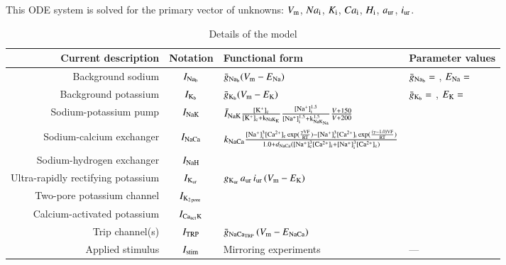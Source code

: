 This ODE system is solved for the primary vector of
unknowns: $V_{\rm m}$, $Na_{\rm i}$, $K_{\rm i}$, $Ca_{\rm i}$,
$H_{\rm i}$, $a_{\rm ur}$, $i_{\rm ur}$.

\begin{table}
\begin{tabular}{r c l l}
\hline\hline
Current description & Notation & Functional form & Parameter values \\ [0.5ex]
\hline
Background sodium & $I_{\rm Na_b}$ & $\bar{g}_{\rm Na_b} (V_{\rm m} - E_{\rm Na})$ \cite{UNKNOWN}
                          & $\bar{g}_{\rm Na_b} = $ \cite{UNKNOWN}, $E_{\rm Na} = $ \cite{UNKNOWN}\\
Background potassium & $I_{\rm K_b}$ & $\bar{g}_{\rm K_b} (V_{\rm m} - E_{\rm K})$ \cite{UNKNOWN}
                          & $\bar{g}_{\rm K_b} = $ \cite{UNKNOWN}, $E_{\rm K} = $ \cite{UNKNOWN}\\
Sodium-potassium pump & $I_{\rm NaK}$ & $\bar{I}_{\rm NaK}
\frac{[\rm K^{+}]_{\rm c}}{[\rm K^{+}]_{\rm c} + k_{\rm NaK_{K}}}
\frac{[\rm Na^{+}]^{1.5}_{\rm i}}{[\rm Na^{+}]^{1.5}_{\rm i} + k^{1.5}_{\rm
    NaK_{Na}}}
\frac{V + 150}{V + 200}$\cite{Nygrenetal1998} & \cite{Nygrenetal1998}\\
Sodium-calcium exchanger & $I_{\rm NaCa}$ & $k_{\rm NaCa}
\frac{[\rm Na^{+}]^{3}_{i}[\rm Ca^{2+}]_{c} \exp(\frac{\gamma V F}{R T}) -
[\rm Na^{+}]^{3}_{c}[\rm Ca^{2+}]_{i} \exp(\frac{(\gamma - 1.0) V F}{R T})}
{1.0 + d_{\rm NaCa}([\rm Na^{+}]^{3}_{c}[\rm Ca^{2+}]_{i} + [\rm
  Na^{+}]^{3}_{i}[\rm Ca^{2+}]_{c})}$
\cite{Nygrenetal1998} & \cite{Nygrenetal1998}\\
Sodium-hydrogen exchanger & $I_{\rm NaH}$ & \cite{UNKNOWN} & \cite{UNKNOWN}\\
Ultra-rapidly rectifying potassium & $I_{\rm K_{ur}}$ & $g_{\rm
  K_{ur}}\, a_{\rm ur}\, i_{\rm ur}\, (V_{\rm m} - E_{\rm K})$ \cite{Maleckaretal2009} & \cite{Maleckaretal2009}\\
Two-pore potassium channel & $I_{\rm K_{2\, pore}}$ & \cite{UNKNOWN} & \cite{UNKNOWN}\\
Calcium-activated potassium & $I_{\rm Ca_{act}K}$ & \cite{UNKNOWN} & \cite{UNKNOWN}\\
Trip channel(s) & $I_{\rm TRP}$ & $\bar{g}_{\rm NaCa_{TRP}}\, (V_{\rm
  m} - E_{\rm NaCa})$ \cite{UNKNOWN} & \cite{UNKNOWN}\\
Applied stimulus & $ I_{\rm stim}$ & Mirroring experiments \cite{Clarketal2011} &  --- \\ [1ex]
\hline
\end{tabular}
\caption{Details of the model}
\label{table:chondrocyte-model-details}
\end{table}

